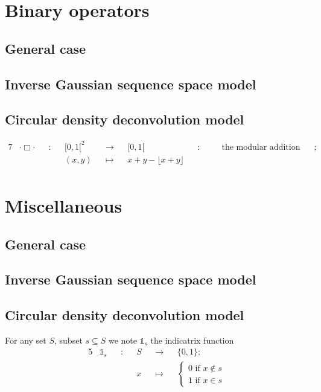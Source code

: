 \section*{Binary operators}
\subsection*{General case}
\subsection*{Inverse Gaussian sequence space model}
\subsection*{Circular density deconvolution model}
\begin{alignat*}{7}
& \cdot \Box \cdot &&:&& [0,1[^{2} &&\rightarrow&& [0,1[ &&: && \quad \text{the modular addition binary operator on the unit segment};\\
& && && (x,y) &&\mapsto&& x+y-\lfloor x+y \rfloor && &&\\
\end{alignat*}

\section*{Miscellaneous}
\subsection*{General case}
\subsection*{Inverse Gaussian sequence space model}
\subsection*{Circular density deconvolution model}
For any set $S$, subset $s \subseteq S$ we note $\mathds{1}_{s}$ the indicatrix function
\begin{alignat*}{5}
	&\mathds{1}_{s} &&:&& S &&\rightarrow&& \{0, 1\};\\
	& && && x && \mapsto &&
		\begin{cases}
			0 \text{ if } x \notin s\\
			1 \text{ if } x \in s
		\end{cases}
\end{alignat*}
















